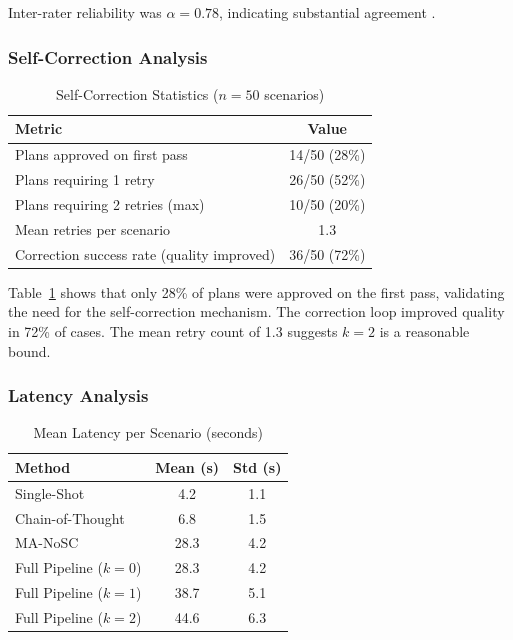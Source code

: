 \documentclass[journal]{IEEEtran}
\begin{document}
Inter-rater reliability was $\alpha = 0.78$, indicating substantial agreement \cite{krippendorff2011computing}.

\subsubsection{Self-Correction Analysis}

\begin{table}[!t]
    \centering
    \caption{Self-Correction Statistics ($n=50$ scenarios)}
    \label{tab:selfcorrect}
    \begin{tabular}{@{}lc@{}}
        \toprule
        \textbf{Metric} & \textbf{Value} \\
        \midrule
        Plans approved on first pass & 14/50 (28\%) \\
        Plans requiring 1 retry & 26/50 (52\%) \\
        Plans requiring 2 retries (max) & 10/50 (20\%) \\
        Mean retries per scenario & 1.3 \\
        Correction success rate (quality improved) & 36/50 (72\%) \\
        \bottomrule
    \end{tabular}
\end{table}

Table~\ref{tab:selfcorrect} shows that only 28\% of plans were approved on the first pass, validating the need for the self-correction mechanism. The correction loop improved quality in 72\% of cases. The mean retry count of 1.3 suggests $k=2$ is a reasonable bound.

\subsubsection{Latency Analysis}

\begin{table}[!t]
    \centering
    \caption{Mean Latency per Scenario (seconds)}
    \label{tab:latency}
    \begin{tabular}{@{}lcc@{}}
        \toprule
        \textbf{Method} & \textbf{Mean (s)} & \textbf{Std (s)} \\
        \midrule
        Single-Shot & 4.2 & 1.1 \\
        Chain-of-Thought & 6.8 & 1.5 \\
        MA-NoSC & 28.3 & 4.2 \\
        Full Pipeline ($k=0$) & 28.3 & 4.2 \\
        Full Pipeline ($k=1$) & 38.7 & 5.1 \\
        Full Pipeline ($k=2$) & 44.6 & 6.3 \\
        \bottomrule
    \end{tabular}
\end{table}
\end{document}
